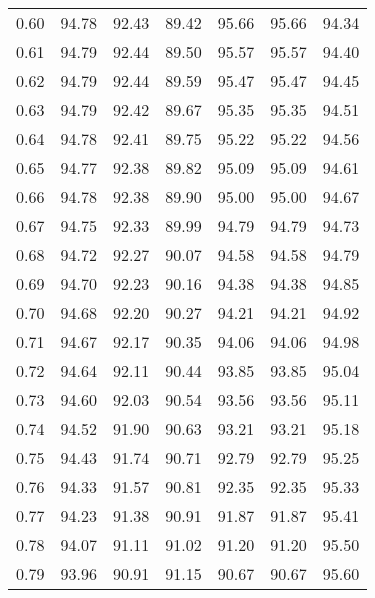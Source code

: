 \begin{tabular}{|c|c|c|c|c|c|c|}
      0.60 &     94.78 &     92.43 &      89.42 &   95.66 &      95.66 &         94.34 \\
      0.61 &     94.79 &     92.44 &      89.50 &   95.57 &      95.57 &         94.40 \\
      0.62 &     94.79 &     92.44 &      89.59 &   95.47 &      95.47 &         94.45 \\
      0.63 &     94.79 &     92.42 &      89.67 &   95.35 &      95.35 &         94.51 \\
      0.64 &     94.78 &     92.41 &      89.75 &   95.22 &      95.22 &         94.56 \\
      0.65 &     94.77 &     92.38 &      89.82 &   95.09 &      95.09 &         94.61 \\
      0.66 &     94.78 &     92.38 &      89.90 &   95.00 &      95.00 &         94.67 \\
      0.67 &     94.75 &     92.33 &      89.99 &   94.79 &      94.79 &         94.73 \\
      0.68 &     94.72 &     92.27 &      90.07 &   94.58 &      94.58 &         94.79 \\
      0.69 &     94.70 &     92.23 &      90.16 &   94.38 &      94.38 &         94.85 \\
      0.70 &     94.68 &     92.20 &      90.27 &   94.21 &      94.21 &         94.92 \\
      0.71 &     94.67 &     92.17 &      90.35 &   94.06 &      94.06 &         94.98 \\
      0.72 &     94.64 &     92.11 &      90.44 &   93.85 &      93.85 &         95.04 \\
      0.73 &     94.60 &     92.03 &      90.54 &   93.56 &      93.56 &         95.11 \\
      0.74 &     94.52 &     91.90 &      90.63 &   93.21 &      93.21 &         95.18 \\
      0.75 &     94.43 &     91.74 &      90.71 &   92.79 &      92.79 &         95.25 \\
      0.76 &     94.33 &     91.57 &      90.81 &   92.35 &      92.35 &         95.33 \\
      0.77 &     94.23 &     91.38 &      90.91 &   91.87 &      91.87 &         95.41 \\
      0.78 &     94.07 &     91.11 &      91.02 &   91.20 &      91.20 &         95.50 \\
      0.79 &     93.96 &     90.91 &      91.15 &   90.67 &      90.67 &         95.60 \\

\end{tabular}
